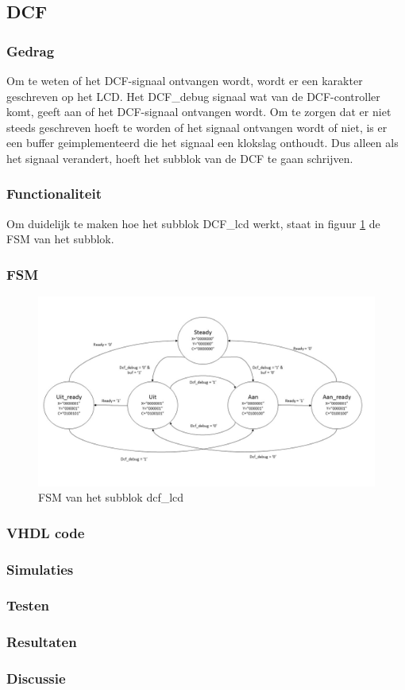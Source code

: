 \subsection{DCF}

\subsubsection{Gedrag}
Om te weten of het DCF-signaal ontvangen wordt, wordt er een karakter geschreven op het LCD. Het DCF\_debug signaal wat van de DCF-controller komt, geeft aan of het DCF-signaal ontvangen wordt. Om te zorgen dat er niet steeds geschreven hoeft te worden of het signaal ontvangen wordt of niet, is er een buffer geimplementeerd die het signaal een klokslag onthoudt. Dus alleen als het signaal verandert, hoeft het subblok van de DCF te gaan schrijven.

\subsubsection{Functionaliteit}
Om duidelijk te maken hoe het subblok DCF\_lcd werkt, staat in figuur \ref{fig:FSMdcf} de FSM van het subblok.

\subsubsection{FSM}

\begin{figure}[h!]
\includegraphics[width=15cm]{verslagschemas/FSMs/FSMdcf}
\caption{FSM van het subblok dcf\_lcd}
\label{fig:FSMdcf}
\end{figure}

\subsubsection{VHDL code}

\subsubsection{Simulaties}

\subsubsection{Testen}

\subsubsection{Resultaten}

\subsubsection{Discussie}